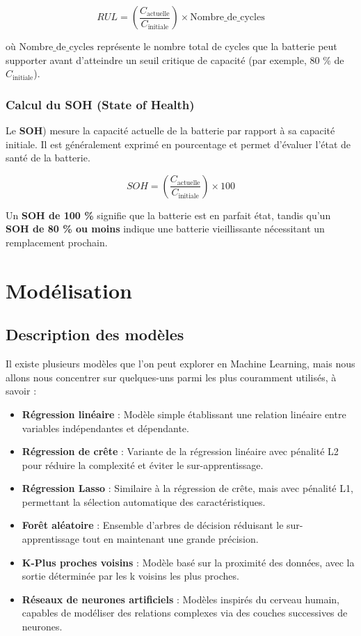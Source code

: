 \begin{equation}
RUL = \left( \frac{C_{\text{actuelle}}}{C_{\text{initiale}}} \right) \times \text{Nombre\_de\_cycles}
\end{equation}

où $\text{Nombre\_de\_cycles}$ représente le nombre total de cycles que la batterie peut supporter avant d'atteindre un seuil critique de capacité (par exemple, 80 \% de $C_{\text{initiale}}$).

\subsubsection*{Calcul du SOH (State of Health)}
Le \textbf{SOH}) mesure la capacité actuelle de la batterie par rapport à sa capacité initiale. Il est généralement exprimé en pourcentage et permet d’évaluer l'état de santé de la batterie.

\begin{equation}
SOH = \left( \frac{C_{\text{actuelle}}}{C_{\text{initiale}}} \right) \times 100
\end{equation}

Un \textbf{SOH de 100 \%} signifie que la batterie est en parfait état, tandis qu’un \textbf{SOH de 80 \% ou moins} indique une batterie vieillissante nécessitant un remplacement prochain.


\section{Modélisation} 
\subsection{Description des modèles}

Il existe plusieurs modèles que l'on peut explorer en Machine Learning, mais nous allons nous concentrer sur quelques-uns parmi les plus couramment utilisés, à savoir :

\begin{itemize}
	\item \textbf{Régression linéaire} : Modèle simple établissant une relation linéaire entre variables indépendantes et dépendante.
	\item \textbf{Régression de crête} : Variante de la régression linéaire avec pénalité L2 pour réduire la complexité et éviter le sur-apprentissage.
	\item \textbf{Régression Lasso} : Similaire à la régression de crête, mais avec pénalité L1, permettant la sélection automatique des caractéristiques.
	\item \textbf{Forêt aléatoire} : Ensemble d'arbres de décision réduisant le sur-apprentissage tout en maintenant une grande précision.
	\item \textbf{K-Plus proches voisins} : Modèle basé sur la proximité des données, avec la sortie déterminée par les k voisins les plus proches.
	\item \textbf{Réseaux de neurones artificiels} : Modèles inspirés du cerveau humain, capables de modéliser des relations complexes via des couches successives de neurones.
\end{itemize}

